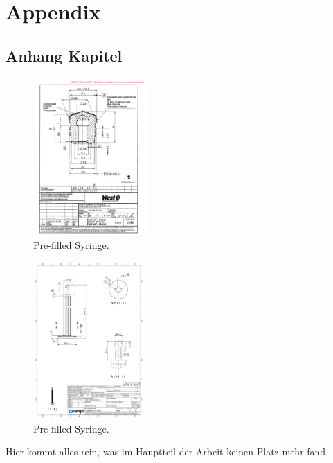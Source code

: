\appendix
\section{Appendix}
\label{s:Anhang}

\subsection{Anhang Kapitel}
\label{sec:umf_pot}

\begin{figure}[h]	
	\centering
\includegraphics[height=6cm]{img/PS.pdf}
   \caption{Pre-filled Syringe.}
 \label{fgr:PFS}
\end{figure}

\begin{figure}[h]	
	\centering
\includegraphics[height=6cm]{img/PR.pdf}
   \caption{Pre-filled Syringe.}
 \label{fgr:PFS}
\end{figure}
Hier kommt alles rein, was im Hauptteil der Arbeit keinen Platz mehr fand.
